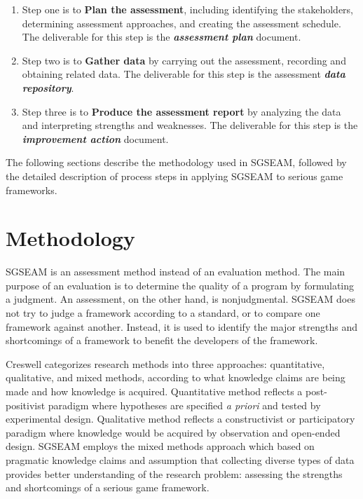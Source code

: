 \begin{enumerate}
\item Step one is to {\bf Plan the assessment}, including
 identifying the stakeholders, determining assessment approaches, and creating the assessment schedule. 
 The deliverable for this step is the \textbf{\textit{assessment
     plan}} document. 

\item Step two is to {\bf Gather data} by carrying out 
 the assessment, recording and obtaining related data. The deliverable for this step is the 
 assessment \textbf{\textit{data repository}}. 

\item Step three is to {\bf Produce the assessment report} by analyzing 
 the data and interpreting strengths and weaknesses. The deliverable
 for this step is the \textbf{\textit{improvement action}} document.

\end{enumerate}
 
The following sections describe the methodology used in SGSEAM, followed by the detailed
description of process steps in applying SGSEAM to serious game frameworks.

\section{Methodology}

SGSEAM is an assessment method instead of an evaluation method. The main purpose 
of an evaluation is to determine the quality of a program by formulating a judgment. An assessment, on 
the other hand, is nonjudgmental. SGSEAM does not try to judge a framework according to a 
standard, or to compare one framework against another. Instead, it is used to identify the major 
strengths and shortcomings of a framework to benefit  the developers of the framework.

Creswell \cite{creswell2003} categorizes research methods into three approaches:
quantitative, qualitative, and mixed methods, according to what knowledge claims are being made
and how knowledge is acquired. Quantitative method reflects a post-positivist paradigm where
hypotheses are specified {\em a priori} and tested by experimental design. Qualitative method
reflects a constructivist or participatory paradigm where knowledge would be acquired by
observation and open-ended design. SGSEAM employs the mixed methods approach which based on
pragmatic knowledge claims and assumption that collecting diverse types of data provides better
understanding of the research problem: assessing the strengths and shortcomings of a serious game
framework.


